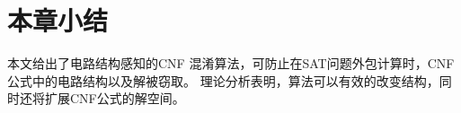 \section{本章小结}
本文给出了电路结构感知的CNF 混淆算法，可防止在SAT问题外包计算时，CNF公式中的电路结构以及解被窃取。
理论分析表明，算法可以有效的改变结构，同时还将扩展CNF公式的解空间。
